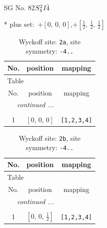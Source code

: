 \documentclass[fleqn,8pt]{jsarticle}
\begin{document}
\setcounter{MaxMatrixCols}{32}

\renewcommand{\tablename}{Table~}
\renewcommand{\figurename}{Figure~}
\begin{center}
\LARGE
SG No. 82\quad$S_{\rm 4}^{2}$\quad$I\bar{4}$\quad[ tetragonal ]
\end{center}
* plus set:\,\,\,$+\left[ 0,\, 0,\, 0 \right]$,\quad $+\left[ \frac{1}{2},\, \frac{1}{2},\, \frac{1}{2} \right]$
\renewcommand{\arraystretch}{1.2}
\begin{longtable}{ccc}
\caption{Wyckoff site: {\tt 2a}, site symmetry: {\tt -4..}}
 \\
 \hline \hline
No. & position & mapping \\ \hline \endfirsthead

\multicolumn{2}{l}{\tablename\ \thetable{}} \\
 \hline \hline
No. & position & mapping \\ \hline \endhead

 \hline \hline
\multicolumn{2}{r}{\footnotesize\it continued ...} \\ \endfoot

 \hline \hline
\multicolumn{2}{r}{} \\ \endlastfoot

1 & $\left[ 0,\, 0,\, 0 \right]$ & {\tt [1,2,3,4]} \\
\end{longtable}
\renewcommand{\arraystretch}{1.2}
\begin{longtable}{ccc}
\caption{Wyckoff site: {\tt 2b}, site symmetry: {\tt -4..}}
 \\
 \hline \hline
No. & position & mapping \\ \hline \endfirsthead

\multicolumn{2}{l}{\tablename\ \thetable{}} \\
 \hline \hline
No. & position & mapping \\ \hline \endhead

 \hline \hline
\multicolumn{2}{r}{\footnotesize\it continued ...} \\ \endfoot

 \hline \hline
\multicolumn{2}{r}{} \\ \endlastfoot

1 & $\left[ 0,\, 0,\, \frac{1}{2} \right]$ & {\tt [1,2,3,4]} \\
\end{longtable}
\renewcommand{\arraystretch}{1.2}
\end{document}
